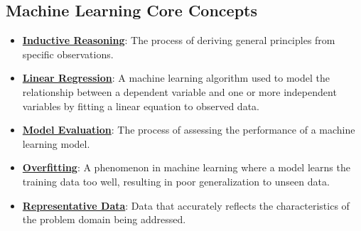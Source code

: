 \documentclass{article}%
\begin{document}
\subsection{Machine Learning Core Concepts}%
\label{subsec:MachineLearningCoreConcepts}%
\begin{itemize}[leftmargin=*]%
\item \href{https://purdue.brightspace.com/d2l/common/assets/pdfjs-d2l-dist/1.0.14-legacy/web/viewer.html?file=%2Fcontent%2Fenforced%2F1095467-wl.202510.CS.24300.001%2F05L2-ML Basics.pdf%3Fou%3D1095467&lang=en-us&container=d2l-fileviewer-rendered-pdf&fullscreen=d2l-fileviewer-rendered-pdf-dialog&height=667#page=3}{\textbf{Inductive Reasoning}}: The process of deriving general principles from specific observations.%
\item \href{https://purdue.brightspace.com/d2l/common/assets/pdfjs-d2l-dist/1.0.14-legacy/web/viewer.html?file=%2Fcontent%2Fenforced%2F1095467-wl.202510.CS.24300.001%2F05L2-ML Basics.pdf%3Fou%3D1095467&lang=en-us&container=d2l-fileviewer-rendered-pdf&fullscreen=d2l-fileviewer-rendered-pdf-dialog&height=667#page=6}{\textbf{Linear Regression}}: A machine learning algorithm used to model the relationship between a dependent variable and one or more independent variables by fitting a linear equation to observed data.%
\item \href{https://purdue.brightspace.com/d2l/common/assets/pdfjs-d2l-dist/1.0.14-legacy/web/viewer.html?file=%2Fcontent%2Fenforced%2F1095467-wl.202510.CS.24300.001%2F05L2-ML Basics.pdf%3Fou%3D1095467&lang=en-us&container=d2l-fileviewer-rendered-pdf&fullscreen=d2l-fileviewer-rendered-pdf-dialog&height=667#page=8}{\textbf{Model Evaluation}}: The process of assessing the performance of a machine learning model.%
\item \href{https://purdue.brightspace.com/d2l/common/assets/pdfjs-d2l-dist/1.0.14-legacy/web/viewer.html?file=%2Fcontent%2Fenforced%2F1095467-wl.202510.CS.24300.001%2F05L2-ML Basics.pdf%3Fou%3D1095467&lang=en-us&container=d2l-fileviewer-rendered-pdf&fullscreen=d2l-fileviewer-rendered-pdf-dialog&height=667#page=14}{\textbf{Overfitting}}: A phenomenon in machine learning where a model learns the training data too well, resulting in poor generalization to unseen data.%
\item \href{https://purdue.brightspace.com/d2l/common/assets/pdfjs-d2l-dist/1.0.14-legacy/web/viewer.html?file=%2Fcontent%2Fenforced%2F1095467-wl.202510.CS.24300.001%2F05L2-ML Basics.pdf%3Fou%3D1095467&lang=en-us&container=d2l-fileviewer-rendered-pdf&fullscreen=d2l-fileviewer-rendered-pdf-dialog&height=667#page=5}{\textbf{Representative Data}}: Data that accurately reflects the characteristics of the problem domain being addressed.%

\end{itemize}
\end{document}
